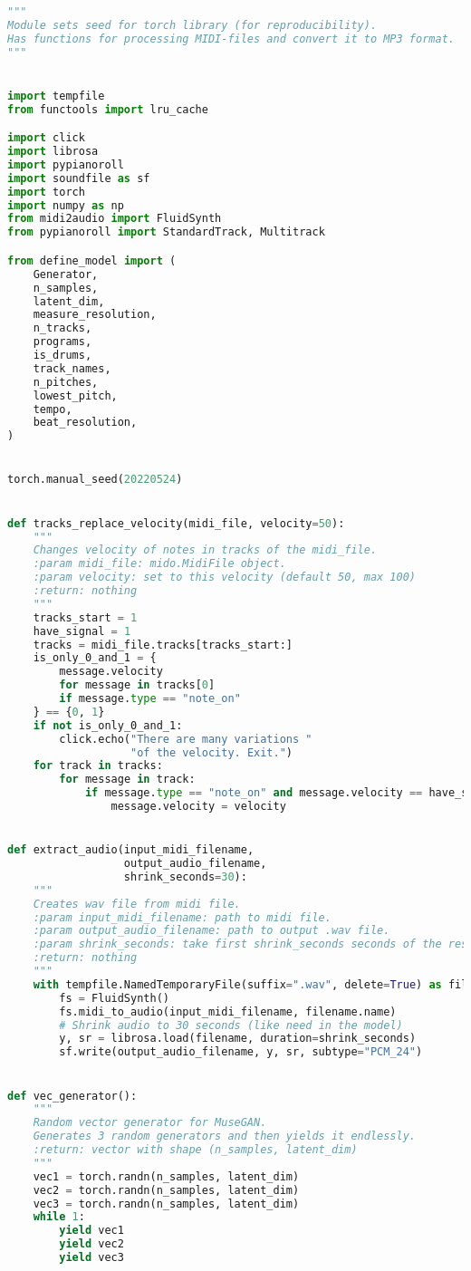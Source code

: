 \begin{lstlisting}[language=Python]
"""
Module sets seed for torch library (for reproducibility).
Has functions for processing MIDI-files and convert it to MP3 format.
"""


import tempfile
from functools import lru_cache

import click
import librosa
import pypianoroll
import soundfile as sf
import torch
import numpy as np
from midi2audio import FluidSynth
from pypianoroll import StandardTrack, Multitrack

from define_model import (
    Generator,
    n_samples,
    latent_dim,
    measure_resolution,
    n_tracks,
    programs,
    is_drums,
    track_names,
    n_pitches,
    lowest_pitch,
    tempo,
    beat_resolution,
)


torch.manual_seed(20220524)


def tracks_replace_velocity(midi_file, velocity=50):
    """
    Changes velocity of notes in tracks of the midi_file.
    :param midi_file: mido.MidiFile object.
    :param velocity: set to this velocity (default 50, max 100)
    :return: nothing
    """
    tracks_start = 1
    have_signal = 1
    tracks = midi_file.tracks[tracks_start:]
    is_only_0_and_1 = {
        message.velocity
        for message in tracks[0]
        if message.type == "note_on"
    } == {0, 1}
    if not is_only_0_and_1:
        click.echo("There are many variations "
                   "of the velocity. Exit.")
    for track in tracks:
        for message in track:
            if message.type == "note_on" and message.velocity == have_signal:
                message.velocity = velocity


def extract_audio(input_midi_filename,
                  output_audio_filename,
                  shrink_seconds=30):
    """
    Creates wav file from midi file.
    :param input_midi_filename: path to midi file.
    :param output_audio_filename: path to output .wav file.
    :param shrink_seconds: take first shrink_seconds seconds of the result.
    :return: nothing
    """
    with tempfile.NamedTemporaryFile(suffix=".wav", delete=True) as filename:
        fs = FluidSynth()
        fs.midi_to_audio(input_midi_filename, filename.name)
        # Shrink audio to 30 seconds (like need in the model)
        y, sr = librosa.load(filename, duration=shrink_seconds)
        sf.write(output_audio_filename, y, sr, subtype="PCM_24")


def vec_generator():
    """
    Random vector generator for MuseGAN.
    Generates 3 random generators and then yields it endlessly.
    :return: vector with shape (n_samples, latent_dim)
    """
    vec1 = torch.randn(n_samples, latent_dim)
    vec2 = torch.randn(n_samples, latent_dim)
    vec3 = torch.randn(n_samples, latent_dim)
    while 1:
        yield vec1
        yield vec2
        yield vec3



\end{lstlisting}
